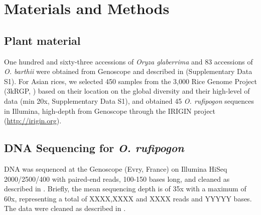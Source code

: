 \documentclass[10pt,letterpaper]{article}
\begin{document}
% 
% 

\section*{Materials and Methods}

\subsection*{Plant material}
One hundred and sixty-three accessions of \textit{Oryza glaberrima} and 83 accessions of \textit{O. barthii} were obtained from Genoscope and described in \cite{Cubry2018} (Supplementary Data S1). For Asian rices, we selected 450 samples from the 3,000 Rice Genome Project (3kRGP, \cite{3kRGP}) based on their location on the global diversity and their high-level of data (min 20x, Supplementary Data S1), and obtained 45 \textit{O. rufipogon} sequences in Illumina, high-depth from Genoscope through the IRIGIN project (\url{http://irigin.org}). 

\subsection*{DNA Sequencing for \textit{O. rufipogon}}
DNA was sequenced at the Genoscope (Evry, France) on Illumina HiSeq 2000/2500/400 with paired-end reads, 100-150 bases long, and cleaned as described in \cite{Cubry2018, Djedatin2017}. Briefly, the mean sequencing depth is of 35x with a maximum of 60x, representing a total of XXXX,XXXX and XXXX reads and YYYYY bases. The data were cleaned as described in \cite{Cubry2018, Djedatin2017}.
\end{document}
